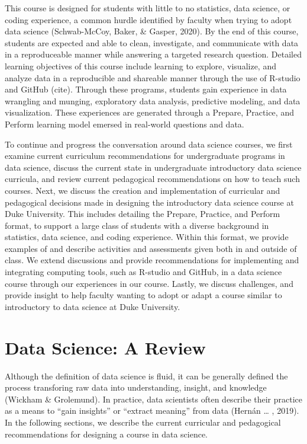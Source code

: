 \documentclass[
  12pt]{article}
\begin{document}
This course is designed for students with little to no statistics, data
science, or coding experience, a common hurdle identified by faculty
when trying to adopt data science (Schwab-McCoy, Baker, \& Gasper,
2020). By the end of this course, students are expected and able to
clean, investigate, and communicate with data in a reproduceable manner
while answering a targeted research question. Detailed learning
objectives of this course include learning to explore, visualize, and
analyze data in a reproducible and shareable manner through the use of
R-studio and GitHub (cite). Through these programs, students gain
experience in data wrangling and munging, exploratory data analysis,
predictive modeling, and data visualization. These experiences are
generated through a Prepare, Practice, and Perform learning model
emersed in real-world questions and data.

To continue and progress the conversation around data science courses,
we first examine current curriculum recommendations for undergraduate
programs in data science, discuss the current state in undergraduate
introductory data science curricula, and review current pedagogical
recommendations on how to teach such courses. Next, we discuss the
creation and implementation of curricular and pedagogical decisions made
in designing the introductory data science course at Duke University.
This includes detailing the Prepare, Practice, and Perform format, to
support a large class of students with a diverse background in
statistics, data science, and coding experience. Within this format, we
provide examples of and describe activities and assessments given both
in and outside of class. We extend discussions and provide
recommendations for implementing and integrating computing tools, such
as R-studio and GitHub, in a data science course through our experiences
in our course. Lastly, we discuss challenges, and provide insight to
help faculty wanting to adopt or adapt a course similar to introductory
to data science at Duke University.

\hypertarget{data-science-a-review}{%
\section{Data Science: A Review}\label{data-science-a-review}}

Although the definition of data science is fluid, it can be generally
defined the process transforing raw data into understanding, insight,
and knowledge (Wickham \& Grolemund). In practice, data scientists often
describe their practice as a means to ``gain insights'' or ``extract
meaning'' from data (Hernán \ldots{} , 2019). In the following sections,
we describe the current curricular and pedagogical recommendations for
designing a course in data science.
\end{document}
